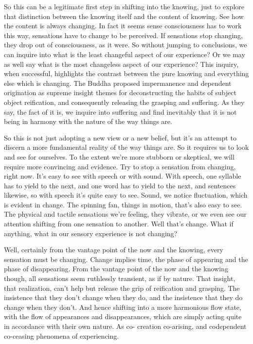 \documentclass[12pt,openany]{book}
\begin{document}
So this can be a legitimate first step in shifting into the knowing, just to explore that distinction between the knowing itself and the content of knowing. See how the content is always changing. In fact it seems sense consciousness has to work this way, sensations have to change to be perceived. If sensations stop changing, they drop out of consciousness, as it were. So without jumping to conclusions, we can inquire into what is the least changeful aspect of our experience? Or we may as well say what is the most changeless aspect of our experience? This inquiry, when successful, highlights the contrast between the pure knowing and everything else which is changing. The Buddha proposed impermanence and dependent origination as supreme insight themes for deconstructing the habits of subject object reification, and consequently releasing the grasping and suffering. As they say, the fact of it is, we inquire into  suffering and find inevitably that it is not being in harmony with the nature of the way things are.

So this is not just adopting a new view or a new belief, but it's an attempt to discern a more fundamental reality of the way things are. So it requires us to look and see for ourselves. To the extent we're more stubborn or skeptical, we will require more convincing and evidence. Try to stop a sensation from changing, right now. It's easy to see with speech or with sound. With speech, one syllable has to yield to the next, and one word has to yield to the next, and sentences likewise, so with speech it's quite easy to see. Sound, we notice fluctuation, which is evident in change. The spinning fan, things in motion, that's also easy to see. The physical and tactile sensations we're feeling, they vibrate, or we even see our attention shifting from one sensation to another. Well that's change. What if anything, what in our sensory experience is not changing?

Well, certainly from the vantage point of the now and the knowing, every sensation must be changing. Change implies time, the \linebreak phase of appearing and the phase of disappearing. From the vantage point of the now and the knowing though, all sensations seem ruthlessly transient, as if by nature. That insight, that realization, can't help but release the grip of reification and grasping. The insistence that they don't change when they do, and the insistence that they do change when they don't. And hence shifting into a more harmonious flow state, with the flow of appearances and disappearances, which are simply acting quite in accordance with their own nature. As co- \linebreak creation co-arising, and codependent co-ceasing phenomena of experiencing. 
\end{document}
